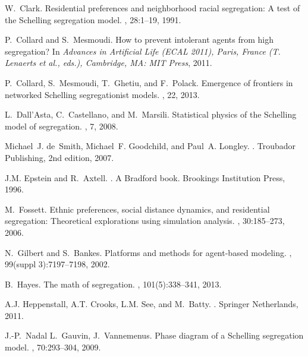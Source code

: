 \documentclass[11pt]{article}
\theoremstyle{plain}
\numberwithin{equation}{subsection}
\begin{document}
\begin{thebibliography}{CMGP13}
W.\ Clark.
\newblock Residential preferences and neighborhood racial segregation: A test
  of the {S}chelling segregation model.
, 28:1--19, 1991.

P.~Collard and S.~Mesmoudi.
\newblock How to prevent intolerant agents from high segregation?
\newblock In {\em Advances in Artificial Life (ECAL 2011), Paris, France (T.
  Lenaerts et al., eds.), Cambridge, MA: MIT Press}, 2011.

P.~Collard, S.~Mesmoudi, T.~Ghetiu, and F.~Polack.
\newblock Emergence of frontiers in networked {S}chelling segregationist
  models.
, 22, 2013.

L.~Dall'Asta, C.~Castellano, and M.~Marsili.
\newblock Statistical physics of the {S}chelling model of segregation.
, 7,
  2008.

Michael~J. de~Smith, Michael~F. Goodchild, and Paul~A. Longley.
.
\newblock Troubador Publishing, 2nd edition, 2007.

J.M. Epstein and R.~Axtell.
.
\newblock A Bradford book. Brookings Institution Press, 1996.

M.~Fossett.
\newblock Ethnic preferences, social distance dynamics, and residential
  segregation: Theoretical explorations using simulation analysis.
, 30:185--273, 2006.

N.~Gilbert and S.~Bankes.
\newblock Platforms and methods for agent-based modeling.
, 99(suppl
  3):7197--7198, 2002.

B.~Hayes.
\newblock The math of segregation.
, 101(5):338--341, 2013.

A.J. Heppenstall, A.T. Crooks, L.M. See, and M.~Batty.
.
\newblock Springer Netherlands, 2011.

J.-P.~Nadal L.~Gauvin, J.~Vannemenus.
\newblock Phase diagram of a {S}chelling segregation model.
, 70:293--304, 2009.


\end{thebibliography}
\end{document}
